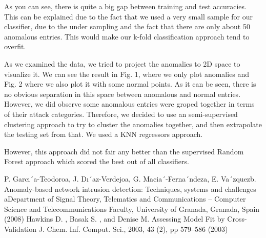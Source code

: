 \documentclass{llncs}
\begin{document}
As you can see, there is quite a big gap between training and test accuracies. This can be explained due to the fact that we used a very small sample for our classifier, due to the under sampling and the fact that there are only about 50 anomalous entries. This would make our k-fold classification approach tend to overfit. 

As we examined the data, we tried to project the anomalies to 2D space to visualize it. We can see the result in Fig. 1, where we only plot anomalies and Fig. 2 where we also plot it with some normal points. As it can be seen, there is no obvious separation in this space between anomalous and normal entries. However, we did observe some anomalous entries were groped together in terms of their attack categories. Therefore, we decided to use an semi-supervised clustering approach to try to cluster the anomalies together, and then extrapolate the testing set from that. We used a KNN regressors approach. 

However, this approach did not fair any better than the supervised Random Forest approach which scored the best out of all classifiers. 

%
%
\begin{thebibliography}{5}
%
P. Garcı´a-Teodoroa, J. Dı´az-Verdejoa, G. Macia´-Ferna´ndeza, E. Va´zquezb.
Anomaly-based network intrusion detection: Techniques, systems and challenges
aDepartment of Signal Theory, Telematics and Communications – Computer Science and Telecommunications Faculty,
University of Granada, Granada, Spain (2008)
Hawkins D. , Basak S. , and Denise M. 
Assessing Model Fit by Cross-Validation
J. Chem. Inf. Comput. Sci., 2003, 43 (2), pp 579–586 (2003)

\end{thebibliography}
\end{document}
